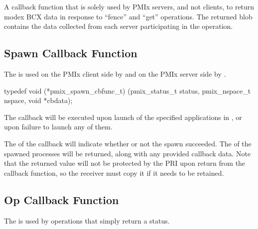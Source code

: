 \descr

A callback function that is solely used by PMIx servers, and not clients, to return modex \ac{BCX} data in response to ``fence'' and ``get'' operations.
The returned blob contains the data collected from each server participating in the operation.



\subsection{Spawn Callback Function}

\summary

The  is used on the PMIx client side by  and on the PMIx server side by .

\cspecificstart
\begin{codepar}
typedef void (*pmix_spawn_cbfunc_t)
    (pmix_status_t status,
     pmix_nspace_t nspace, void *cbdata);
\end{codepar}
\cspecificend

\begin{arglist}
\end{arglist}


\descr

The callback will be executed upon launch of the specified applications in , or upon failure to launch any of them.

The  of the callback will indicate whether or not the spawn succeeded.
The  of the spawned processes will be returned, along with any provided callback data.
Note that the returned  value will not be protected by the \ac{PRI} upon return from the callback function, so the receiver must copy it if it needs to be retained.


\subsection{Op Callback Function}

\summary

The  is used by operations that simply return a status.

